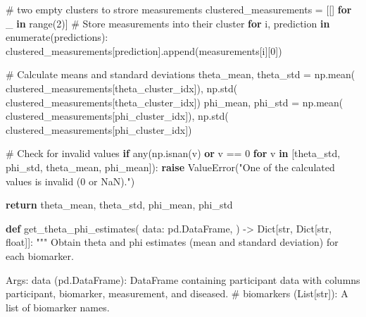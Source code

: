 \documentclass[
  letterpaper,
  DIV=11,
  numbers=noendperiod]{scrreprt}
\newenvironment{Shaded}{\begin{snugshade}}{\end{snugshade}}
\newcommand{\BuiltInTok}[1]{\textcolor[rgb]{0.00,0.23,0.31}{#1}}
\newcommand{\CommentTok}[1]{\textcolor[rgb]{0.37,0.37,0.37}{#1}}
\newcommand{\ControlFlowTok}[1]{\textcolor[rgb]{0.00,0.23,0.31}{\textbf{#1}}}
\newcommand{\DecValTok}[1]{\textcolor[rgb]{0.68,0.00,0.00}{#1}}
\newcommand{\KeywordTok}[1]{\textcolor[rgb]{0.00,0.23,0.31}{\textbf{#1}}}
\newcommand{\NormalTok}[1]{\textcolor[rgb]{0.00,0.23,0.31}{#1}}
\newcommand{\OperatorTok}[1]{\textcolor[rgb]{0.37,0.37,0.37}{#1}}
\newcommand{\PreprocessorTok}[1]{\textcolor[rgb]{0.68,0.00,0.00}{#1}}
\newcommand{\StringTok}[1]{\textcolor[rgb]{0.13,0.47,0.30}{#1}}
\begin{document}
\begin{Shaded}
\begin{Highlighting}[]
    \CommentTok{\# two empty clusters to strore measurements}
\NormalTok{    clustered\_measurements }\OperatorTok{=}\NormalTok{ [[] }\ControlFlowTok{for}\NormalTok{ \_ }\KeywordTok{in} \BuiltInTok{range}\NormalTok{(}\DecValTok{2}\NormalTok{)]}
    \CommentTok{\# Store measurements into their cluster}
    \ControlFlowTok{for}\NormalTok{ i, prediction }\KeywordTok{in} \BuiltInTok{enumerate}\NormalTok{(predictions):}
\NormalTok{        clustered\_measurements[prediction].append(measurements[i][}\DecValTok{0}\NormalTok{])}
    
     \CommentTok{\# Calculate means and standard deviations}
\NormalTok{    theta\_mean, theta\_std }\OperatorTok{=}\NormalTok{ np.mean(}
\NormalTok{        clustered\_measurements[theta\_cluster\_idx]), np.std(}
\NormalTok{            clustered\_measurements[theta\_cluster\_idx])}
\NormalTok{    phi\_mean, phi\_std }\OperatorTok{=}\NormalTok{ np.mean(}
\NormalTok{        clustered\_measurements[phi\_cluster\_idx]), np.std(}
\NormalTok{            clustered\_measurements[phi\_cluster\_idx])}
    
    \CommentTok{\# Check for invalid values}
    \ControlFlowTok{if} \BuiltInTok{any}\NormalTok{(np.isnan(v) }\KeywordTok{or}\NormalTok{ v }\OperatorTok{==} \DecValTok{0} \ControlFlowTok{for}\NormalTok{ v }\KeywordTok{in}\NormalTok{ [theta\_std, phi\_std, theta\_mean, phi\_mean]):}
        \ControlFlowTok{raise} \PreprocessorTok{ValueError}\NormalTok{(}\StringTok{"One of the calculated values is invalid (0 or NaN)."}\NormalTok{)}

    \ControlFlowTok{return}\NormalTok{ theta\_mean, theta\_std, phi\_mean, phi\_std}

\KeywordTok{def}\NormalTok{ get\_theta\_phi\_estimates(}
\NormalTok{    data: pd.DataFrame,}
\NormalTok{) }\OperatorTok{{-}\textgreater{}}\NormalTok{ Dict[}\BuiltInTok{str}\NormalTok{, Dict[}\BuiltInTok{str}\NormalTok{, }\BuiltInTok{float}\NormalTok{]]:}
    \CommentTok{"""}
\CommentTok{    Obtain theta and phi estimates (mean and standard deviation) for each biomarker.}

\CommentTok{    Args:}
\CommentTok{    data (pd.DataFrame): DataFrame containing participant data with columns \textquotesingle{}participant\textquotesingle{}, }
\CommentTok{        \textquotesingle{}biomarker\textquotesingle{}, \textquotesingle{}measurement\textquotesingle{}, and \textquotesingle{}diseased\textquotesingle{}.}
\CommentTok{    \# biomarkers (List[str]): A list of biomarker names.}


\end{Highlighting}
\end{Shaded}
\end{document}
